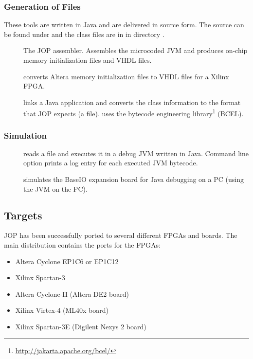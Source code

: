\subsubsection{Generation of Files}

These tools are written in Java and are delivered in source form.
The source can be found under  and the class
files are in  in directory
.

\begin{description}
    \item[] The JOP assembler. Assembles the microcoded
    JVM and produces on-chip memory initialization files and VHDL
    files.
    \item[] converts Altera memory initialization
        files to VHDL files for a Xilinx FPGA.
    \item[] links a Java application and converts the
    class information to the format that JOP expects (a  file).
     uses the bytecode engineering library\footnote{\url{http://jakarta.apache.org/bcel/}} (BCEL).

\end{description}

\subsubsection{Simulation}

\begin{description}
    \item[] reads a  file and executes it in
    a debug JVM written in Java. Command line option
     prints a log entry for each executed JVM
    bytecode.
    \item[] simulates the BaseIO expansion board for Java
    debugging on a PC (using the JVM on the PC).
\end{description}

\subsection{Targets}

JOP has been successfully ported to several different FPGAs and
boards. The main distribution contains the ports for the FPGAs:

\begin{itemize}
    \item Altera Cyclone EP1C6 or EP1C12
    \item Xilinx Spartan-3
    \item Altera Cyclone-II (Altera DE2 board)
    \item Xilinx Virtex-4 (ML40x board)
    \item Xilinx Spartan-3E (Digilent Nexys 2 board)
\end{itemize}

